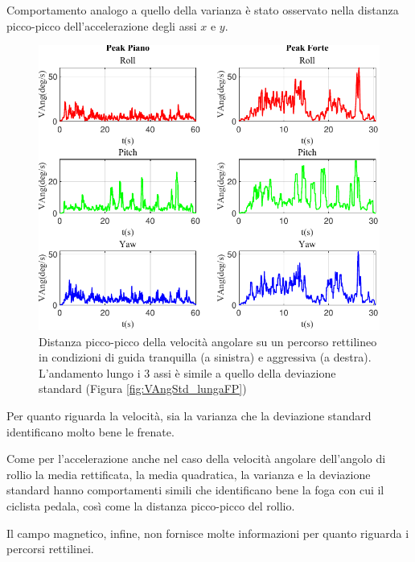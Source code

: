 \documentclass[class=article]{standalone}
\begin{document}
	Comportamento analogo a quello della varianza è stato osservato nella distanza picco-picco dell'accelerazione degli assi \(x\) e \(y\).\hfill\break
	
	\begin{center}
		\begin{figure}[h!]
			\centering\includegraphics[width=.7\textwidth]{img/lungaFP/VAng/Peak}
			\caption[]{Distanza picco-picco della velocità angolare su un percorso rettilineo in condizioni di guida tranquilla (a sinistra) e aggressiva (a destra). L'andamento lungo i 3 assi è simile a quello della deviazione standard (Figura \ref{fig:VAngStd_lungaFP})}
			\label{fig:VAngPeak_lungaFP}
		\end{figure}
	\end{center}
	
	Per quanto riguarda la velocità, sia la varianza che la deviazione standard identificano molto bene le frenate.\hfill\break
	
	Come per l'accelerazione anche nel caso della velocità angolare dell'angolo di rollio la media rettificata, la media quadratica, la varianza e la deviazione standard hanno comportamenti simili che identificano bene la foga con cui il ciclista pedala, così come la distanza picco-picco del rollio.\hfill\break
	
	Il campo magnetico, infine, non fornisce molte informazioni per quanto riguarda i percorsi rettilinei.
	
\end{document}
